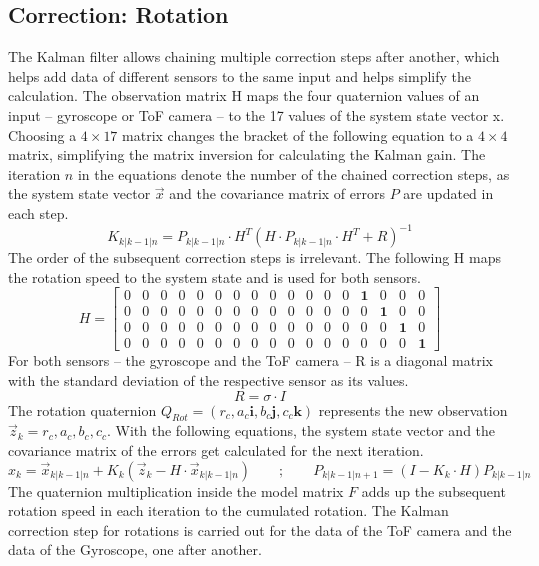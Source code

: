 \subsection{Correction: Rotation}
\label{sec:CorrectionRotation}
The Kalman filter allows chaining multiple correction steps after another, which helps add data of different sensors to the same input and helps simplify the calculation. The observation matrix H maps the four quaternion values of an input – gyroscope or ToF camera – to the 17 values of the system state vector x. Choosing a $4\times17$ matrix changes the bracket of the following equation to a $4\times4$ matrix, simplifying the matrix inversion for calculating the Kalman gain. The iteration $n$ in the equations denote the number of the chained correction steps, as the system state vector $\vec{x}$ and the covariance matrix of errors $P$ are updated in each step.
\begin{equation*}
    K_{k|k-1|n} = P_{k|k-1|n}\cdot H^{T}(H\cdot P_{k|k-1|n}\cdot H^{T}+R)^{-1}
\end{equation*}
The order of the subsequent correction steps is irrelevant. The following H maps the rotation speed to the system state and is used for both sensors.
\begin{equation*}
    H=
    \begin{bmatrix}
        0 & 0 & 0 & 0 & 0 & 0 & 0 & 0 & 0 & 0 & 0 & 0 & 0 & \textbf{1} & 0 & 0 & 0 \\
        0 & 0 & 0 & 0 & 0 & 0 & 0 & 0 & 0 & 0 & 0 & 0 & 0 & 0 & \textbf{1} & 0 & 0 \\
        0 & 0 & 0 & 0 & 0 & 0 & 0 & 0 & 0 & 0 & 0 & 0 & 0 & 0 & 0 & \textbf{1} & 0 \\
        0 & 0 & 0 & 0 & 0 & 0 & 0 & 0 & 0 & 0 & 0 & 0 & 0 & 0 & 0 & 0 & \textbf{1}
    \end{bmatrix}
\end{equation*}
For both sensors – the gyroscope and the ToF camera – R is a diagonal matrix with the standard deviation of the respective sensor as its values.
\begin{equation*}
    R = \sigma \cdot I
\end{equation*}
The rotation quaternion $Q_{Rot}=(r_{c}, a_{c}\textbf{i}, b_{c}\textbf{j}, c_{c}\textbf{k})$ represents the new observation $\vec{z}_{k} = r_{c}, a_{c}, b_{c}, c_{c}$. With the following equations, the system state vector and the covariance matrix of the errors get calculated for the next iteration.
\begin{equation*}
    x_{k} = \vec{x}_{k|k-1|n}+K_{k}(\vec{z}_{k}-H\cdot \vec{x}_{k|k-1|n})
    \qquad ; \qquad
    P_{k|k-1|n+1}= (I-K_{k}\cdot H)P_{k|k-1|n}
\end{equation*}
The quaternion multiplication inside the model matrix $F$ adds up the subsequent rotation speed in each iteration to the cumulated rotation. The Kalman correction step for rotations is carried out for the data of the ToF camera and the data of the Gyroscope, one after another.


